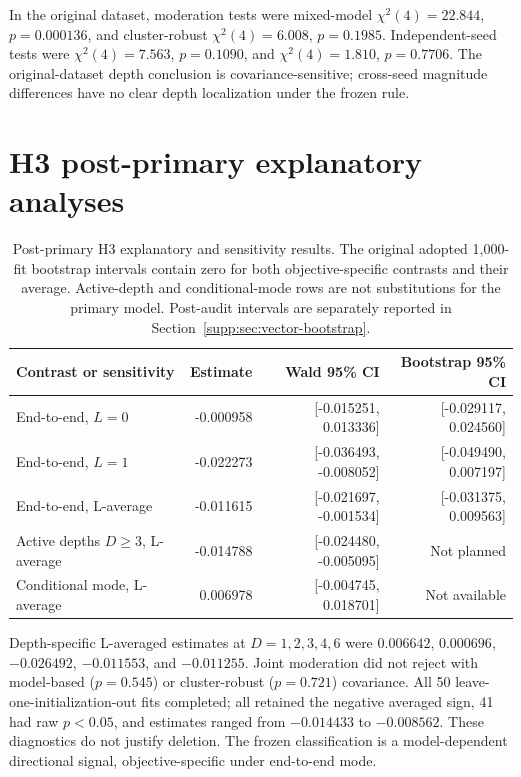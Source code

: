 \documentclass[pdflatex,sn-basic,Numbered]{sn-jnl}
\begin{document}
In the original dataset, moderation tests were mixed-model $\chi^2(4)=22.844$, $p=0.000136$, and cluster-robust $\chi^2(4)=6.008$, $p=0.1985$. Independent-seed tests were $\chi^2(4)=7.563$, $p=0.1090$, and $\chi^2(4)=1.810$, $p=0.7706$. The original-dataset depth conclusion is covariance-sensitive; cross-seed magnitude differences have no clear depth localization under the frozen rule.

\section{H3 post-primary explanatory analyses}

\begin{table}[t]
\centering\small
\begin{tabular}{lrrr}
\toprule
Contrast or sensitivity & Estimate & Wald 95\% CI & Bootstrap 95\% CI \\
\midrule
End-to-end, $L=0$ & -0.000958 & [-0.015251, 0.013336] & [-0.029117, 0.024560] \\
End-to-end, $L=1$ & -0.022273 & [-0.036493, -0.008052] & [-0.049490, 0.007197] \\
End-to-end, L-average & -0.011615 & [-0.021697, -0.001534] & [-0.031375, 0.009563] \\
Active depths $D\ge3$, L-average & -0.014788 & [-0.024480, -0.005095] & Not planned \\
Conditional mode, L-average & 0.006978 & [-0.004745, 0.018701] & Not available \\
\bottomrule
\end{tabular}
\caption{Post-primary H3 explanatory and sensitivity results. The original adopted 1,000-fit bootstrap intervals contain zero for both objective-specific contrasts and their average. Active-depth and conditional-mode rows are not substitutions for the primary model. Post-audit intervals are separately reported in Section~\ref{supp:sec:vector-bootstrap}.}
\end{table}

Depth-specific L-averaged estimates at $D=1,2,3,4,6$ were $0.006642$, $0.000696$, $-0.026492$, $-0.011553$, and $-0.011255$. Joint moderation did not reject with model-based ($p=0.545$) or cluster-robust ($p=0.721$) covariance. All 50 leave-one-initialization-out fits completed; all retained the negative averaged sign, 41 had raw $p<0.05$, and estimates ranged from $-0.014433$ to $-0.008562$. These diagnostics do not justify deletion. The frozen classification is a model-dependent directional signal, objective-specific under end-to-end mode.
\end{document}
